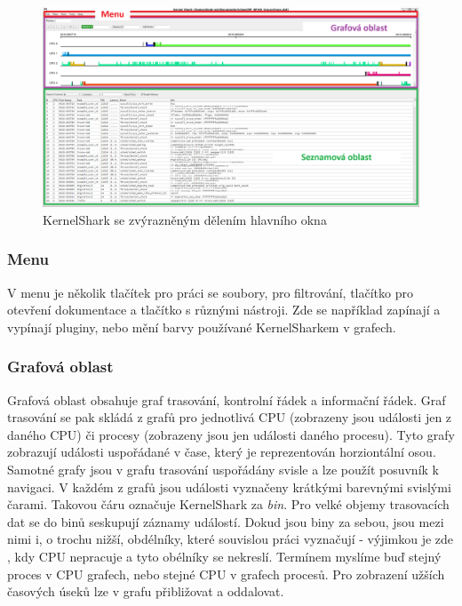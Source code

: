 \begin{figure}[p]\centering
    \includegraphics[width=140mm]{img/KernelShark/kshark-divisions}
    \caption{KernelShark se zvýrazněným dělením hlavního okna}
    \label{kshark-divs}
\end{figure}

\subsubsection*{Menu}
V menu je několik tlačítek pro práci se soubory, pro filtrování, tlačítko pro otevření dokumentace a tlačítko s různými nástroji. Zde se například zapínají a vypínají pluginy, nebo mění barvy používané KernelSharkem v grafech. 

\subsubsection*{Grafová oblast}
Grafová oblast obsahuje graf trasování, kontrolní řádek a informační řádek. Graf trasování se pak skládá z grafů pro jednotlivá CPU (zobrazeny jsou události jen z daného CPU) či procesy (zobrazeny jsou jen události daného procesu). Tyto grafy zobrazují události uspořádané v čase, který je reprezentován horziontální osou. Samotné grafy jsou v grafu trasování uspořádány svisle a lze použít posuvník k navigaci. V každém z grafů jsou události vyznačeny krátkými barevnými svislými čarami. Takovou čáru označuje KernelShark za \emph{bin}. Pro velké objemy trasovacích dat se do binů seskupují záznamy událostí. Dokud jsou biny  za sebou, jsou mezi nimi i, o trochu nižší, obdélníky, které souvislou práci vyznačují - výjimkou je zde , kdy CPU nepracuje a tyto obélníky se nekreslí. Termínem  myslíme buď stejný proces v CPU grafech, nebo stejné CPU v grafech procesů. Pro zobrazení užších časových úseků lze v grafu přibližovat a oddalovat.

